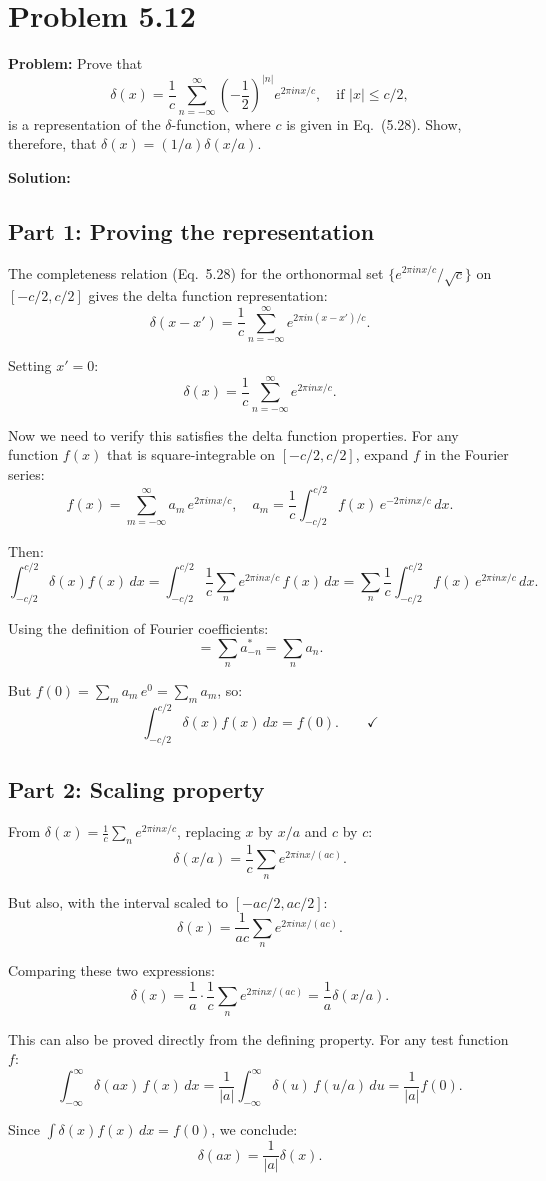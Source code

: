 \documentclass[12pt]{article}
\begin{document}
\section*{Problem 5.12}

\textbf{Problem:} Prove that
\[
\delta(x) = \frac{1}{c}\sum_{n=-\infty}^{\infty}\left(-\frac{1}{2}\right)^{|n|} e^{2\pi i n x/c}, \quad \text{if } |x| \leq c/2,
\]
is a representation of the $\delta$-function, where $c$ is given in Eq.\ (5.28). Show, therefore, that $\delta(x) = (1/a)\delta(x/a)$.

\bigskip
\textbf{Solution:}

\subsection*{Part 1: Proving the representation}

The completeness relation (Eq.\ 5.28) for the orthonormal set $\{e^{2\pi inx/c}/\sqrt{c}\}$ on $[-c/2, c/2]$ gives the delta function representation:
\[
\delta(x - x') = \frac{1}{c}\sum_{n=-\infty}^{\infty} e^{2\pi i n(x-x')/c}.
\]

Setting $x' = 0$:
\[
\delta(x) = \frac{1}{c}\sum_{n=-\infty}^{\infty}e^{2\pi inx/c}.
\]

Now we need to verify this satisfies the delta function properties. For any function $f(x)$ that is square-integrable on $[-c/2, c/2]$, expand $f$ in the Fourier series:
\[
f(x) = \sum_{m=-\infty}^{\infty}a_m\,e^{2\pi imx/c}, \quad a_m = \frac{1}{c}\int_{-c/2}^{c/2}f(x)\,e^{-2\pi imx/c}\,dx.
\]

Then:
\[
\int_{-c/2}^{c/2}\delta(x)f(x)\,dx = \int_{-c/2}^{c/2}\frac{1}{c}\sum_{n}e^{2\pi inx/c}\,f(x)\,dx = \sum_n\frac{1}{c}\int_{-c/2}^{c/2}f(x)\,e^{2\pi inx/c}\,dx.
\]

Using the definition of Fourier coefficients:
\[
= \sum_n a_{-n}^* = \sum_n a_n.
\]

But $f(0) = \sum_m a_m\,e^0 = \sum_m a_m$, so:
\[
\int_{-c/2}^{c/2}\delta(x)f(x)\,dx = f(0). \qquad \checkmark
\]

\subsection*{Part 2: Scaling property}

From $\delta(x) = \frac{1}{c}\sum_n e^{2\pi inx/c}$, replacing $x$ by $x/a$ and $c$ by $c$:
\[
\delta(x/a) = \frac{1}{c}\sum_n e^{2\pi inx/(ac)}.
\]

But also, with the interval scaled to $[-ac/2, ac/2]$:
\[
\delta(x) = \frac{1}{ac}\sum_n e^{2\pi inx/(ac)}.
\]

Comparing these two expressions:
\[
\delta(x) = \frac{1}{a}\cdot\frac{1}{c}\sum_n e^{2\pi inx/(ac)} = \frac{1}{a}\delta(x/a).
\]

This can also be proved directly from the defining property. For any test function $f$:
\[
\int_{-\infty}^{\infty}\delta(ax)\,f(x)\,dx = \frac{1}{|a|}\int_{-\infty}^{\infty}\delta(u)\,f(u/a)\,du = \frac{1}{|a|}f(0).
\]

Since $\int\delta(x)f(x)\,dx = f(0)$, we conclude:
\[
\boxed{\delta(ax) = \frac{1}{|a|}\delta(x).}
\]
\end{document}
